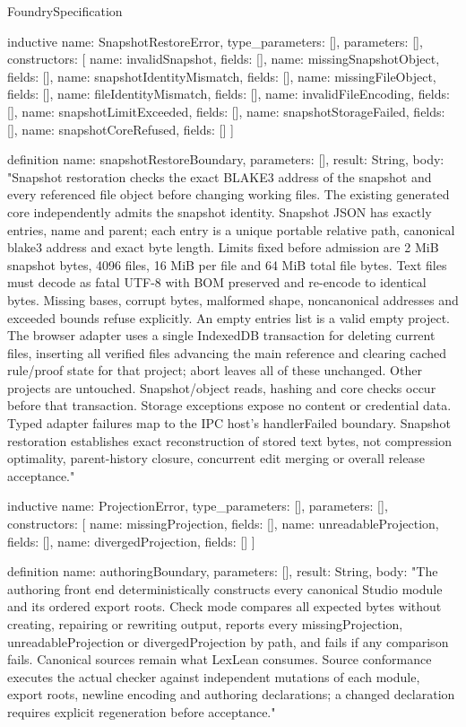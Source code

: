 \begin{lexlean}{FoundrySpecification}
\begin{semanticmodule}
inductive{
  name: SnapshotRestoreError,
  type_parameters: [],
  parameters: [],
  constructors: [
    {name: invalidSnapshot, fields: []},
    {name: missingSnapshotObject, fields: []},
    {name: snapshotIdentityMismatch, fields: []},
    {name: missingFileObject, fields: []},
    {name: fileIdentityMismatch, fields: []},
    {name: invalidFileEncoding, fields: []},
    {name: snapshotLimitExceeded, fields: []},
    {name: snapshotStorageFailed, fields: []},
    {name: snapshotCoreRefused, fields: []}
  ]
}

definition{
  name: snapshotRestoreBoundary,
  parameters: [],
  result: String,
  body: "Snapshot restoration checks the exact BLAKE3 address of the snapshot and every referenced file object before changing working files. The existing generated core independently admits the snapshot identity. Snapshot JSON has exactly entries, name and parent; each entry is a unique portable relative path, canonical blake3 address and exact byte length. Limits fixed before admission are 2 MiB snapshot bytes, 4096 files, 16 MiB per file and 64 MiB total file bytes. Text files must decode as fatal UTF-8 with BOM preserved and re-encode to identical bytes. Missing bases, corrupt bytes, malformed shape, noncanonical addresses and exceeded bounds refuse explicitly. An empty entries list is a valid empty project. The browser adapter uses a single IndexedDB transaction for deleting current files, inserting all verified files advancing the main reference and clearing cached rule/proof state for that project; abort leaves all of these unchanged. Other projects are untouched. Snapshot/object reads, hashing and core checks occur before that transaction. Storage exceptions expose no content or credential data. Typed adapter failures map to the IPC host's handlerFailed boundary. Snapshot restoration establishes exact reconstruction of stored text bytes, not compression optimality, parent-history closure, concurrent edit merging or overall release acceptance."
}

inductive{
  name: ProjectionError,
  type_parameters: [],
  parameters: [],
  constructors: [
    {name: missingProjection, fields: []},
    {name: unreadableProjection, fields: []},
    {name: divergedProjection, fields: []}
  ]
}

definition{
  name: authoringBoundary,
  parameters: [],
  result: String,
  body: "The authoring front end deterministically constructs every canonical Studio module and its ordered export roots. Check mode compares all expected bytes without creating, repairing or rewriting output, reports every missingProjection, unreadableProjection or divergedProjection by path, and fails if any comparison fails. Canonical sources remain what LexLean consumes. Source conformance executes the actual checker against independent mutations of each module, export roots, newline encoding and authoring declarations; a changed declaration requires explicit regeneration before acceptance."
}


\end{semanticmodule}
\end{lexlean}
